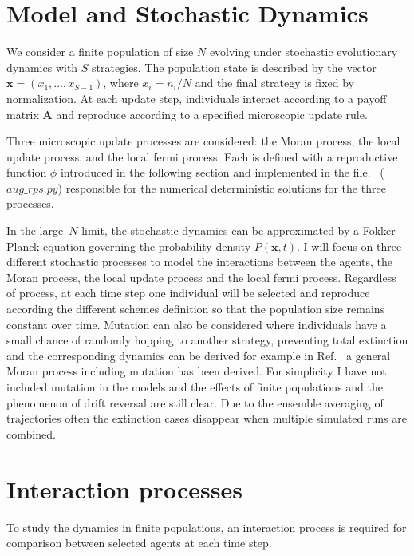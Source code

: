 \documentclass[%
 reprint,
 amsmath,amssymb,
 aps,
]{revtex4-2}
\begin{document}
\section{Model and Stochastic Dynamics}
We consider a finite population of size $N$ evolving under stochastic evolutionary dynamics with $S$ strategies.
The population state is described by the vector 
$\mathbf{x} = (x_1,\dots,x_{S-1})$, where $x_i = n_i/N$ 
and the final strategy is fixed by normalization.
At each update step, individuals interact according to a 
payoff matrix $\mathbf{A}$ and reproduce according to a 
specified microscopic update rule.

Three microscopic update processes are considered: the Moran process,
the local update process, and the local fermi process. Each is defined with a 
reproductive function $\phi$ introduced in the following section and implemented in the 
file.~\cite{aug_rps} ($aug\_rps.py$) responsible for the numerical deterministic 
solutions for the three processes.

In the large--$N$ limit, the stochastic dynamics can be
 approximated by a Fokker--Planck equation governing the 
 probability density $P(\mathbf{x},t)$. 
I will focus on three different stochastic processes to 
model the interactions between the agents, the Moran process,
the local update process and the local fermi process.
Regardless of process, at each time step one individual will 
be selected and reproduce according the different schemes definition
so that the population size remains constant over time.
Mutation can also be considered where individuals have a 
small chance of randomly hopping to another strategy, preventing 
total extinction and the corresponding dynamics 
can be derived for example in Ref.~\cite{general_moran_process} 
a general Moran process
including mutation has been derived.
For simplicity I have not included mutation in the models 
and the effects of finite populations and the phenomenon of 
drift reversal are still clear. Due to the 
ensemble averaging of trajectories often the extinction cases
disappear when multiple simulated runs are combined.



\section{\label{sec:interaction_processes}Interaction processes}

To study the dynamics in finite populations, an interaction process is required for 
comparison between selected agents at each time step.
\end{document}
